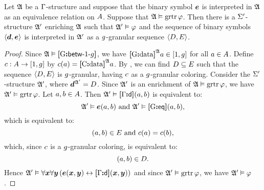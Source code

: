\begin{lemma}\label{lem:granular-tr-to-f}
Let $\mathfrak{A}$ be a $\mathrm{\Gamma}$-structure and suppose that the binary symbol $\bm{e}$ is
interpreted in $\mathfrak{A}$ as an equivalence relation on $A$.
Suppose that $\mathfrak{A} \vDash \operatorname{grtr}\varphi$.
Then there is a $\mathrm{\Sigma'}$-structure $\mathfrak{A'}$ enriching $\mathfrak{A}$ such that 
$\mathfrak{A'} \vDash \varphi$ and the sequence of binary symbols $\left\langle \bm{d},\bm{e} \right\rangle$ is
interpreted in $\mathfrak{A'}$ as a $g$-granular sequence $\left\langle D,E \right\rangle$.
\end{lemma}
\begin{proof}
Since $\mathfrak{A} \vDash {\bm{[}{\mathrm{G}}\mathord{\bm{:}}\mathsf{betw}{\hbox{-}}1{\hbox{-}}g\bm{]}}$, we have 
${\bm{[}{\mathrm{G}}\mathord{\bm{:}}\mathrm{data}\bm{]}}^{\mathfrak{A}}a \in [1,g]$ for all $a \in A$.
Define ${c : A \to [1,g]}$ by $c(a) = {\bm{[}{\mathrm{C}}\mathord{\bm{:}}\mathrm{data}\bm{]}}^{\mathfrak{A}}a$.
By , we can find $D \subseteq E$ such that 
the sequence $\left\langle D,E \right\rangle$ is $g$-granular, having $c$ as a
$g$-granular coloring.
Consider the $\mathrm{\Sigma'}$-structure $\mathfrak{A'}$, where $\bm{d}^{\mathfrak{A'}} = D$.
Since $\mathfrak{A'}$ is an enrichment of $\mathfrak{A} \vDash \operatorname{grtr}\varphi$, we have
$\mathfrak{A'} \vDash \operatorname{grtr}\varphi$.
Let $a,b \in A$. 
Then $\mathfrak{A'} \vDash {\bm{[}\mathrm{\Gamma}\mathord{\bm{:}}\mathsf{d}\bm{]}}(a,b)$ is equivalent to:
\[
  \mathfrak{A'} \vDash \bm{e}(a,b) \text{ and } \mathfrak{A'} \vDash {\bm{[}{\mathrm{G}}\mathord{\bm{:}}\mathsf{eq}\bm{]}}(a,b),
\]
which is equivalent to:
\[
  (a,b) \in E \text{ and } c(a) = c(b),
\]
which, since $c$ is a $g$-granular coloring, is equivalent to:
\[
  (a,b) \in D.
\]
Hence
$\mathfrak{A'} \vDash \forall\bm{x}\forall\bm{y}
\left(\bm{e}(\bm{x},\bm{y}) \leftrightarrow {\bm{[}\mathrm{\Gamma}\mathord{\bm{:}}\mathsf{d}\bm{]}}(\bm{x},\bm{y})\right)$
and since $\mathfrak{A'} \vDash \operatorname{grtr}\varphi$, we have $\mathfrak{A'} \vDash \varphi$.
\end{proof}
